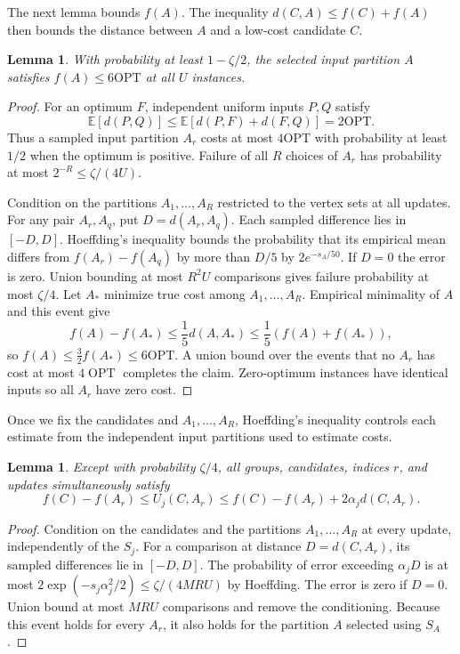 \documentclass[11pt]{article}
\newtheorem{lemma}[theorem]{Lemma}
\newcommand{\OPT}{\operatorname{OPT}}
\begin{document}
The next lemma bounds $f(A)$. The inequality $d(C,A)\le f(C)+f(A)$
then bounds the distance between $A$ and a low-cost candidate $C$.

\begin{lemma}
\label{lem:ms-anchor}
With probability at least $1-\zeta/2$, the selected input partition $A$ satisfies
$f(A)\le6\mathrm{OPT}$ at all $U$ instances.
\end{lemma}
\begin{proof}
For an optimum $F$, independent uniform inputs $P,Q$ satisfy
\[
 \mathbb E[d(P,Q)]\le\mathbb E[d(P,F)+d(F,Q)]=2\mathrm{OPT}.
\]
Thus a sampled input partition $A_r$ costs at most $4\mathrm{OPT}$ with probability
at least $1/2$ when the optimum is positive.  Failure of all $R$
choices of $A_r$ has probability at most $2^{-R}\le\zeta/(4U)$.

Condition on the partitions $A_1,\ldots,A_R$ restricted to the vertex sets at all
updates.  For any pair $A_r,A_q$,
put $D=d(A_r,A_q)$.  Each sampled difference lies in $[-D,D]$.
Hoeffding's inequality bounds the probability that its empirical mean
differs from $f(A_r)-f(A_q)$ by more than $D/5$ by
$2e^{-s_A/50}$.  If $D=0$ the error is zero.  Union bounding at most
$R^2U$ comparisons gives failure probability at most $\zeta/4$.
Let $A_*$ minimize true cost among $A_1,\ldots,A_R$.  Empirical
minimality of $A$ and this event give
\[
 f(A)-f(A_*)\le\frac15d(A,A_*)
                   \le\frac15(f(A)+f(A_*)),
\]
so $f(A)\le\tfrac32f(A_*)\le6\mathrm{OPT}$.
A union bound over the events that no $A_r$ has cost at
most $4\OPT$ completes the claim.  Zero-optimum instances have identical inputs
so all $A_r$ have zero cost.
\end{proof}

Once we fix the candidates and $A_1,\ldots,A_R$, Hoeffding's inequality
controls each estimate from the independent input partitions used to estimate costs.

\begin{lemma}
\label{lem:ms-confidence}
Except with probability $\zeta/4$, all groups, candidates, indices $r$,
and updates simultaneously satisfy
\begin{equation}
 f(C)-f(A_r)\le U_j(C,A_r)
      \le f(C)-f(A_r)+2\alpha_jd(C,A_r).
 \label{eq:ms-confidence}
\end{equation}
\end{lemma}
\begin{proof}
Condition on the candidates and the partitions $A_1,\ldots,A_R$ at every update, independently
of the $S_j$.  For a comparison at distance $D=d(C,A_r)$, its sampled
differences lie in $[-D,D]$.  The probability of error exceeding
$\alpha_jD$ is at most
$2\exp(-s_j\alpha_j^2/2)\le\zeta/(4MRU)$ by Hoeffding.
The error is zero if $D=0$.  Union bound at most $MRU$ comparisons
and remove the conditioning.  Because this event holds for every $A_r$, it also holds for the
partition $A$ selected using $S_A$.
\end{proof}
\end{document}

